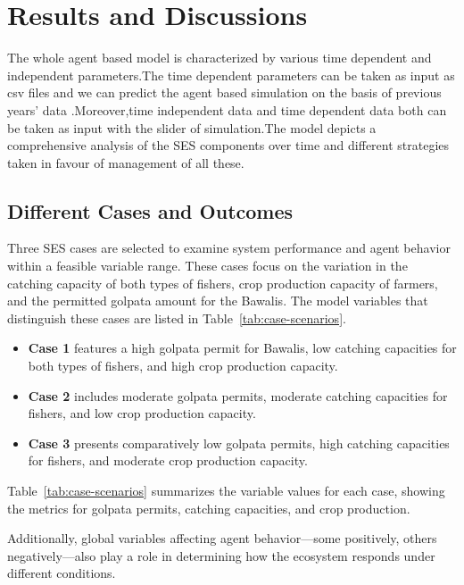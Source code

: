 \documentclass[final,5p,times,twocolumn,authoryear]{elsarticle}
\begin{document}
\section{ Results and Discussions}

The whole agent based model is characterized by various time dependent and independent parameters.The time dependent parameters can be taken as input as csv files and we can predict the agent based simulation on the basis of previous years' data .Moreover,time independent data and time dependent data both can be taken as input with the slider of simulation.The model depicts a comprehensive analysis of the SES components over time and different strategies taken in favour of management of all these.
\subsection{Different Cases and Outcomes}
Three SES cases are selected to examine system performance and agent behavior within a feasible variable range. These cases focus on the variation in the catching capacity of both types of fishers, crop production capacity of farmers, and the permitted golpata amount for the Bawalis. The model variables that distinguish these cases are listed in Table~\ref{tab:case-scenarios}.

\begin{itemize}
    \item \textbf{Case 1} features a high golpata permit for Bawalis, low catching capacities for both types of fishers, and high crop production capacity.
    \item \textbf{Case 2} includes moderate golpata permits, moderate catching capacities for fishers, and low crop production capacity.
    \item \textbf{Case 3} presents comparatively low golpata permits, high catching capacities for fishers, and moderate crop production capacity.
\end{itemize}

Table~\ref{tab:case-scenarios} summarizes the variable values for each case, showing the metrics for golpata permits, catching capacities, and crop production.

Additionally, global variables affecting agent behavior---some positively, others negatively---also play a role in determining how the ecosystem responds under different conditions.
\end{document}
